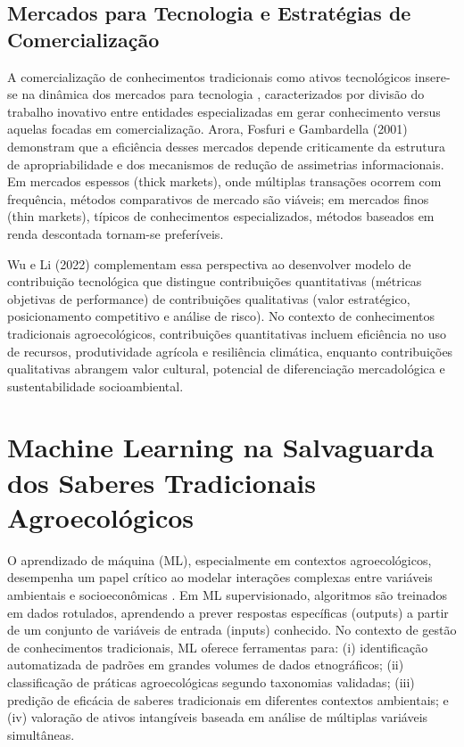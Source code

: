 \subsection{Mercados para Tecnologia e Estratégias de Comercialização}

A comercialização de conhecimentos tradicionais como ativos tecnológicos insere-se na dinâmica dos mercados para tecnologia \cite{AroraEtAl2001}, caracterizados por divisão do trabalho inovativo entre entidades especializadas em gerar conhecimento versus aquelas focadas em comercialização. Arora, Fosfuri e Gambardella (2001) demonstram que a eficiência desses mercados depende criticamente da estrutura de apropriabilidade e dos mecanismos de redução de assimetrias informacionais. Em mercados espessos (thick markets), onde múltiplas transações ocorrem com frequência, métodos comparativos de mercado são viáveis; em mercados finos (thin markets), típicos de conhecimentos especializados, métodos baseados em renda descontada tornam-se preferíveis.

Wu e Li (2022) complementam essa perspectiva ao desenvolver modelo de contribuição tecnológica que distingue contribuições quantitativas (métricas objetivas de performance) de contribuições qualitativas (valor estratégico, posicionamento competitivo e análise de risco). No contexto de conhecimentos tradicionais agroecológicos, contribuições quantitativas incluem eficiência no uso de recursos, produtividade agrícola e resiliência climática, enquanto contribuições qualitativas abrangem valor cultural, potencial de diferenciação mercadológica e sustentabilidade socioambiental.

\section{Machine Learning na Salvaguarda dos Saberes Tradicionais Agroecológicos}

O aprendizado de máquina (ML), especialmente em contextos agroecológicos, desempenha um papel crítico ao modelar interações complexas entre variáveis ambientais e socioeconômicas \cite{Zhou2018}. Em ML supervisionado, algoritmos são treinados em dados rotulados, aprendendo a prever respostas específicas (outputs) a partir de um conjunto de variáveis de entrada (inputs) conhecido. No contexto de gestão de conhecimentos tradicionais, ML oferece ferramentas para: (i) identificação automatizada de padrões em grandes volumes de dados etnográficos; (ii) classificação de práticas agroecológicas segundo taxonomias validadas; (iii) predição de eficácia de saberes tradicionais em diferentes contextos ambientais; e (iv) valoração de ativos intangíveis baseada em análise de múltiplas variáveis simultâneas. 

